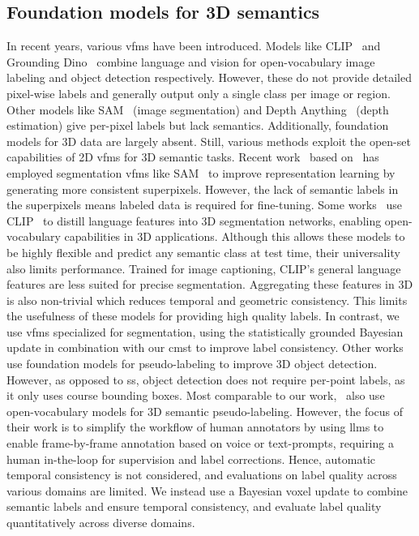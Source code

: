 \subsection{Foundation models for 3D semantics}
In recent years, various \glspl{vfm} have been introduced. Models like CLIP~\cite{radford_learning_2021} and Grounding Dino~\cite{liu_grounding_2023} combine language and vision for open-vocabulary image labeling and object detection respectively. However, these do not provide detailed pixel-wise labels and generally output only a single class per image or region. Other models like SAM~\cite{kirillov_segment_2023} (image segmentation) and Depth Anything~\cite{yang_depth_2024} (depth estimation) give per-pixel labels but lack semantics. Additionally, foundation models for 3D data are largely absent. Still, various methods exploit the open-set capabilities of 2D \glspl{vfm} for 3D semantic tasks.
Recent work~\cite{liu_segment_2023} based on~\cite{sautier_image--lidar_2022, mahmoud_self-supervised_2023} has employed segmentation \glspl{vfm} like SAM~\cite{kirillov_segment_2023} to improve representation learning by generating more consistent superpixels. However, the lack of semantic labels in the superpixels means labeled data is required for fine-tuning.
Some works~\cite{zhang_pointclip_2022, peng_openscene_2023, chen_clip2scene_2023, tan_ovo_2023, vobecky_pop-3d_2024, hess_lidarclip_2024} use CLIP~\cite{radford_learning_2021} to distill language features into 3D segmentation networks, enabling open-vocabulary capabilities in 3D applications. 
Although this allows these models to be highly flexible and predict any semantic class at test time, their universality also limits performance. Trained for image captioning, CLIP’s general language features are less suited for precise segmentation. Aggregating these features in 3D is also non-trivial which reduces temporal and geometric consistency. This limits the usefulness of these models for providing high quality labels. In contrast, we use \glspl{vfm} specialized for segmentation, using the statistically grounded Bayesian update in combination with our \gls{cmst} to improve label consistency.
Other works~\cite{khurana_shelf-supervised_2024, zhang_sam3d_2024, najibi_unsupervised_2023} use foundation models for pseudo-labeling to improve 3D object detection. However, as opposed to \gls{ss}, object detection does not require per-point labels, as it only uses course bounding boxes.
Most comparable to our work,~\cite{zhou_openannotate3d_2024, zhou_openannotate2_2024} also use open-vocabulary models for 3D semantic pseudo-labeling. However, the focus of their work is to simplify the workflow of human annotators by using \glspl{llm} to enable frame-by-frame annotation based on voice or text-prompts, requiring a human in-the-loop for supervision and label corrections. Hence, automatic temporal consistency is not considered, and evaluations on label quality across various domains are limited. We instead use a Bayesian voxel update to combine semantic labels and ensure temporal consistency, and evaluate label quality quantitatively across diverse domains.